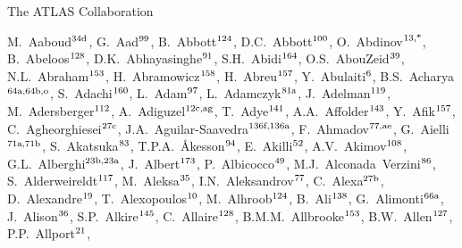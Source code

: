 
\begin{flushleft}
{\Large The ATLAS Collaboration}

\bigskip

M.~Aaboud$^\textrm{\scriptsize 34d}$,    
G.~Aad$^\textrm{\scriptsize 99}$,    
B.~Abbott$^\textrm{\scriptsize 124}$,    
D.C.~Abbott$^\textrm{\scriptsize 100}$,    
O.~Abdinov$^\textrm{\scriptsize 13,*}$,    
B.~Abeloos$^\textrm{\scriptsize 128}$,    
D.K.~Abhayasinghe$^\textrm{\scriptsize 91}$,    
S.H.~Abidi$^\textrm{\scriptsize 164}$,    
O.S.~AbouZeid$^\textrm{\scriptsize 39}$,    
N.L.~Abraham$^\textrm{\scriptsize 153}$,    
H.~Abramowicz$^\textrm{\scriptsize 158}$,    
H.~Abreu$^\textrm{\scriptsize 157}$,    
Y.~Abulaiti$^\textrm{\scriptsize 6}$,    
B.S.~Acharya$^\textrm{\scriptsize 64a,64b,o}$,    
S.~Adachi$^\textrm{\scriptsize 160}$,    
L.~Adam$^\textrm{\scriptsize 97}$,    
L.~Adamczyk$^\textrm{\scriptsize 81a}$,    
J.~Adelman$^\textrm{\scriptsize 119}$,    
M.~Adersberger$^\textrm{\scriptsize 112}$,    
A.~Adiguzel$^\textrm{\scriptsize 12c,ag}$,    
T.~Adye$^\textrm{\scriptsize 141}$,    
A.A.~Affolder$^\textrm{\scriptsize 143}$,    
Y.~Afik$^\textrm{\scriptsize 157}$,    
C.~Agheorghiesei$^\textrm{\scriptsize 27c}$,    
J.A.~Aguilar-Saavedra$^\textrm{\scriptsize 136f,136a}$,    
F.~Ahmadov$^\textrm{\scriptsize 77,ae}$,    
G.~Aielli$^\textrm{\scriptsize 71a,71b}$,    
S.~Akatsuka$^\textrm{\scriptsize 83}$,    
T.P.A.~{\AA}kesson$^\textrm{\scriptsize 94}$,    
E.~Akilli$^\textrm{\scriptsize 52}$,    
A.V.~Akimov$^\textrm{\scriptsize 108}$,    
G.L.~Alberghi$^\textrm{\scriptsize 23b,23a}$,    
J.~Albert$^\textrm{\scriptsize 173}$,    
P.~Albicocco$^\textrm{\scriptsize 49}$,    
M.J.~Alconada~Verzini$^\textrm{\scriptsize 86}$,    
S.~Alderweireldt$^\textrm{\scriptsize 117}$,    
M.~Aleksa$^\textrm{\scriptsize 35}$,    
I.N.~Aleksandrov$^\textrm{\scriptsize 77}$,    
C.~Alexa$^\textrm{\scriptsize 27b}$,    
D.~Alexandre$^\textrm{\scriptsize 19}$,    
T.~Alexopoulos$^\textrm{\scriptsize 10}$,    
M.~Alhroob$^\textrm{\scriptsize 124}$,    
B.~Ali$^\textrm{\scriptsize 138}$,    
G.~Alimonti$^\textrm{\scriptsize 66a}$,    
J.~Alison$^\textrm{\scriptsize 36}$,    
S.P.~Alkire$^\textrm{\scriptsize 145}$,    
C.~Allaire$^\textrm{\scriptsize 128}$,    
B.M.M.~Allbrooke$^\textrm{\scriptsize 153}$,    
B.W.~Allen$^\textrm{\scriptsize 127}$,    
P.P.~Allport$^\textrm{\scriptsize 21}$,    

\end{flushleft}
